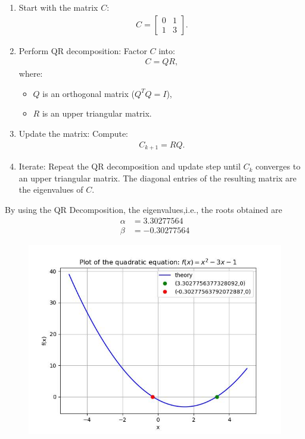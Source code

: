 \documentclass[journal,12pt,onecolumn]{IEEEtran}
\theoremstyle{remark}
\begin{document}
\begin{enumerate}
    \item Start with the matrix $C$:
    \begin{align}
    C = \begin{bmatrix}
    0 & 1 \\
    1 & 3
    \end{bmatrix}.
    \end{align}

    \item Perform QR decomposition:
    Factor $C$ into:
    \begin{align}
    C = QR,
    \end{align}
    where:
    \begin{itemize}
        \item $Q$ is an orthogonal matrix ($Q^T Q = I$),
        \item $R$ is an upper triangular matrix.
    \end{itemize}

    \item Update the matrix:
    Compute:
    \begin{align}
    C_{k+1} = RQ.
    \end{align}

    \item Iterate:
    Repeat the QR decomposition and update step until $C_k$ converges to an upper triangular matrix. The diagonal entries of the resulting matrix are the eigenvalues of $C$.
\end{enumerate}
By using the QR Decomposition, the eigenvalues,i.e., the roots obtained are
\begin{align}
    \alpha&=3.30277564\\
    \beta&=-0.30277564
\end{align}

\begin{figure}[h] %
    \centering %
    \includegraphics[width=0.5\columnwidth]{figs/Newton-Raphson.jpeg} %
    \label{fig:example_image} %
\end{figure}
\end{document}
